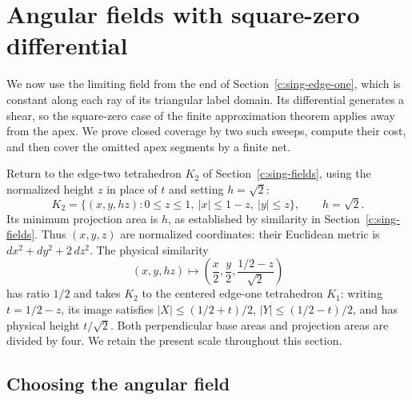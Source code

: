 \section{Angular fields with square-zero differential}
\label{c:nil-section}

We now use the limiting field from the end of
Section~\ref{c:sing-edge-one}, which is constant along each ray of its
triangular label domain.  Its differential generates a shear, so
the square-zero case of the finite approximation theorem applies
away from the apex.  We prove closed coverage by two such sweeps, compute
their cost, and then cover the omitted apex segments by a finite net.

Return to the edge-two tetrahedron $K_2$ of Section~\ref{c:sing-fields},
using the normalized height $z$ in place of $t$ and setting $h=\sqrt2$:
\begin{equation}\label{c:nil-tetrahedron}
 K_2=
 \{(x,y,hz):0\le z\le1,\ |x|\le1-z,\ |y|\le z\},
 \qquad h=\sqrt2.
\end{equation}
Its minimum projection area is $h$, as established by similarity in
Section~\ref{c:sing-fields}.
Thus $(x,y,z)$ are normalized coordinates: their Euclidean metric is
$dx^2+dy^2+2\,dz^2$.  The physical similarity
\begin{equation}\label{c:nil-similarity}
 (x,y,hz)\longmapsto
 \left(\frac{x}{2},\frac{y}{2},\frac{1/2-z}{\sqrt2}\right)
\end{equation}
has ratio $1/2$ and takes $K_2$ to the centered edge-one
tetrahedron $K_1$: writing $t=1/2-z$, its image satisfies
$|X|\le(1/2+t)/2$, $|Y|\le(1/2-t)/2$, and has physical height
$t/\sqrt2$.  Both perpendicular base areas and projection areas are
divided by four.  We retain the present scale throughout this section.

\subsection{Choosing the angular field}

